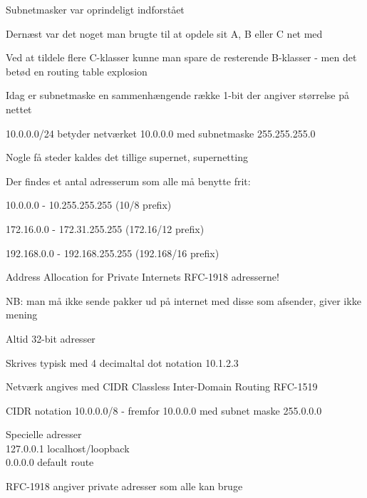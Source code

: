 \documentclass[Screen16to9,17pt]{foils}
\begin{document}


\begin{list1}
\item Subnetmasker var oprindeligt indforstået
\item Dernæst var det noget man brugte til at opdele sit A, B eller C net med
\item Ved at tildele flere C-klasser kunne man spare de resterende B-klasser - men det betød en routing table explosion
\item Idag er subnetmaske en sammenhængende række 1-bit der angiver størrelse på nettet
\item 10.0.0.0/24 betyder netværket 10.0.0.0 med subnetmaske 255.255.255.0
\item Nogle få steder kaldes det tillige supernet, supernetting
\end{list1}



\begin{list1}
\item Der findes et antal adresserum som alle må benytte frit:
\begin{list2}
\item 10.0.0.0    -  10.255.255.255  (10/8 prefix)
\item 172.16.0.0  -  172.31.255.255  (172.16/12 prefix)
\item 192.168.0.0 -  192.168.255.255 (192.168/16 prefix)
\end{list2}
\item Address Allocation for Private Internets RFC-1918 adresserne!
\item NB: man må ikke sende pakker ud på internet med disse som afsender, giver ikke mening
\end{list1}


\begin{list2}
\item Altid 32-bit adresser
\item Skrives typisk med 4 decimaltal dot notation 10.1.2.3
\item Netværk angives med CIDR Classless Inter-Domain Routing RFC-1519
\item CIDR notation 10.0.0.0/8 -
  fremfor 10.0.0.0 med subnet maske 255.0.0.0
\item Specielle adresser\\
127.0.0.1 localhost/loopback\\
0.0.0.0  default route
\item RFC-1918 angiver private adresser som alle kan bruge

\end{list2}
\end{document}
